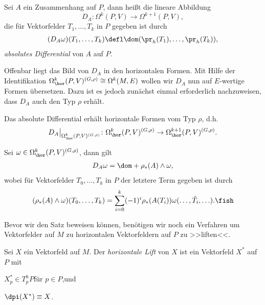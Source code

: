\documentclass[%
	paper=a5,%
	fleqn,%
	DIV=18,%
	BCOR=0mm,
	fontsize=11pt,
	titlepage=false,%
	bibliography=totoc,
	DIV=18,%
	twoside=true,
	pdftitle=Riemannsche Geometrie,
	pdfauthor=Uwe Semmelmann,
	numbers=noendperiod]%
	{scrbook}
\begin{document}
\begin{defn}
Sei $A$ ein Zusammenhang auf $P$, dann heißt die lineare Abbildung 
\[D_A \colon
\Omega^k(P,V)\to \Omega^{k+1}(P,V),\]
die für Vektorfelder $T_1,\ldots,T_k$ in $P$ gegeben ist durch
\begin{align*}
(D_A\omega)(T_1,\ldots,T_k) \defl \dom(\pr_h(T_1),\ldots,\pr_h(T_k)),
\end{align*}
\emph{absolutes Differential} von $A$ auf $P$.\fish
\end{defn}

Offenbar liegt das Bild von $D_A$ in den horizontalen Formen. Mit Hilfe der
Identifikation $\Omega_\hor^k(P,V)^{(G,\rho)}\cong \Omega^k(M,E)$ wollen wir
$D_A$ nun auf $E$-wertige Formen übersetzen. Dazu ist es jedoch zunächst einmal erforderlich nachzuweisen, dass
$D_A$ auch den Typ $\rho$ erhält.

\begin{prop}
\label{prop:Absolutes-Differential}
\begin{propenum}
\item Das absolute Differential erhält horizontale Formen vom Typ $\rho$, d.h.
\begin{align*}
D_A\big|_{\Omega_\hor^k(P,V)^{(G,\rho)}} \colon \Omega_\hor^k(P,V)^{(G,\rho)} \to
\Omega_\hor^{k+1}(P,V)^{(G,\rho)}.
\end{align*}
\item Sei $\omega\in\Omega_\hor^k(P,V)^{(G,\rho)}$, dann gilt
\begin{align*}
D_A\omega = \dom + \rho_*(A)\wedge \omega,
\end{align*}
wobei für Vektorfelder $T_0,\ldots,T_k$ in $P$ der letztere Term gegeben ist
durch
\begin{align*}
(\rho_*(A)\wedge \omega)(T_0,\ldots,T_k) = 
\sum_{i=0}^k (-1)^i \rho_*(A(T_i))\omega(\ldots,\hat{T}_i,\ldots).\fish
\end{align*}
\end{propenum}
\end{prop}

Bevor wir den Satz beweisen können, benötigen wir noch ein Verfahren um
Vektorfelder auf $M$ zu horizontalen Vektorfeldern auf $P$ zu >>liften<<. 

\begin{defn}
Sei $X$ ein Vektorfeld auf $M$. Der \emph{horizontale Lift} von $X$ ist ein
Vektorfeld $X^*$ auf $P$ mit
\begin{defnenum}
\item $X^*_p\in T_p^hP$\quad für $p\in P$,\quad und
\item $\dpi(X^*) \equiv X$.\fish
\end{defnenum}
\end{defn}
\end{document}
